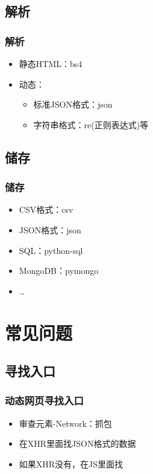 \documentclass{beamer}
\begin{document}
\subsection{解析}
\begin{frame}
\frametitle{解析}
\begin{itemize}
  \item 静态HTML：bs4\footnotemark
  \item 动态：
  \begin{itemize}
    \item 标准JSON格式：json
    \item 字符串格式：re(正则表达式)等
  \end{itemize}
\end{itemize}
\end{frame}

\subsection{储存}
\begin{frame}
\frametitle{储存}
\begin{itemize}
   \item CSV格式：csv
   \item JSON格式：json
   \item SQL：python-sql
   \item MongoDB：pymongo
   \item \ldots
\end{itemize}
\end{frame}

\section{常见问题}
\subsection{寻找入口}
\begin{frame}
\frametitle{动态网页寻找入口}
\begin{itemize}
  \item 审查元素-Network：抓包
  \item 在XHR里面找JSON格式的数据
  \item 如果XHR没有，在JS里面找
\end{itemize}
\end{frame}
\end{document}
